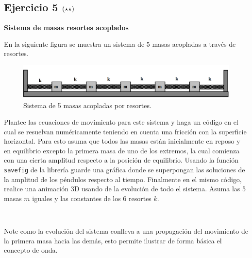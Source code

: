 \newpage
\subsection*{Ejercicio 5 \large{$\left( \star \star \right)$}}

\textbf{Sistema de masas resortes acoplados}

En la siguiente figura se muestra un sistema de 5 masas acopladas a través
de resortes.


\begin{figure}[htbp]
	\centering
	\includegraphics[width=1.00\textwidth]
	{./pictures/acopled_mass_spring.png}

	\caption{\small{Sistema de 5 masas acopladas por resortes.}}
	
	\label{fig:two_springs}
\end{figure}


Plantee las ecuaciones de movimiento para este sistema y haga un código en 
el cual se resuelvan numéricamente teniendo en cuenta una fricción con la 
superficie horizontal. Para esto asuma que todos las masas están inicialmente 
en reposo y en equilibrio excepto la primera masa de uno de los extremos, la 
cual comienza con una cierta amplitud respecto a la posición de equilibrio. 
Usando la función \texttt{savefig} de la librería \matplotlib guarde una 
gráfica donde se superpongan las soluciones de la amplitud de los péndulos
respecto al tiempo. Finalmente en el mismo código, realice una animación
3D usando \mayavi de la evolución de todo el sistema. Asuma las 5 masas $m$ 
iguales y las constantes de los 6 resortes $k$.

\

Note como la evolución del sistema conlleva a una propagación del movimiento
de la primera masa hacia las demás, esto permite ilustrar de forma básica el
concepto de onda.



